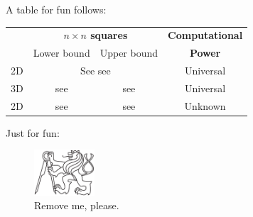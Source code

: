 
A table for fun follows:
\begin{center}
\begin{tabular}{|| c || c | c | c ||}
	\hline\hline
	~ & \multicolumn{2}{c|}{\bf $n\times n$ squares} & {\bf Computational} \\
	~ & \multicolumn{1}{c}{Lower bound} & \multicolumn{1}{c|}{Upper bound} & {\bf Power}\\
	\hline
	2D & \multicolumn{2}{c|}{See see} & Universal \\
	\hline
	3D & see & see & Universal \\
	\hline
	2D & see & see & Unknown \\
	\hline\hline
\end{tabular}
\end{center}

Just for fun:
\begin{figure}[H]
\begin{center}
	\includegraphics[width=0.2\textwidth]{./figures/fig.pdf} %
	\caption{Remove me, please.}
	\label{fig:3color}
\end{center}
\end{figure}

